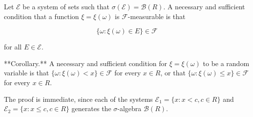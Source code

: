 Let $\mathcal{E}$ be a system of sets such that $\sigma(\mathcal{E}) = \mathcal{B}(R)$. A necessary and sufficient condition that a function $\xi = \xi(\omega)$ is $\mathcal{F}$-measurable is that

$$\{\omega : \xi(\omega) \in E\} \in \mathcal{F}$$

for all $E \in \mathcal{E}$.

**Corollary.** A necessary and sufficient condition for $\xi = \xi(\omega)$ to be a random variable is that $\{\omega : \xi(\omega) < x\} \in \mathcal{F}$ for every $x \in R$, or that $\{\omega : \xi(\omega) \leq x\} \in \mathcal{F}$ for every $x \in R$.

The proof is immediate, since each of the systems $\mathcal{E}_1 = \{x : x < c, c \in R\}$ and $\mathcal{E}_2 = \{x : x \leq c, c \in R\}$ generates the $\sigma$-algebra $\mathcal{B}(R)$.
